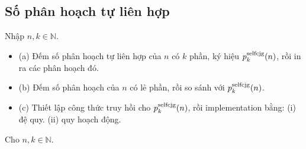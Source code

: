 \documentclass{article}
\begin{document}
	\subsection*{Số phân hoạch tự liên hợp}
	 Nhập $n,k\in\mathbb{N}$. 
	 \begin{itemize}
	 	\item (a) Đếm số phân hoạch tự liên hợp của $n$ có $k$ phần, ký hiệu $p_k^{\rm selfcjg}(n)$, rồi in ra các phân hoạch đó.
	 	\item (b) Đếm số phân hoạch của $n$ có lẻ phần, rồi so sánh với $p_k^{\rm selfcjg}(n)$.
	 	\item (c) Thiết lập công thức truy hồi cho $p_k^{\rm selfcjg}(n)$, rồi implementation bằng: (i) đệ quy. (ii) quy hoạch động.
	 \end{itemize}
	   
	Cho $n,k\in\mathbb{N}$.
	
\end{document}
